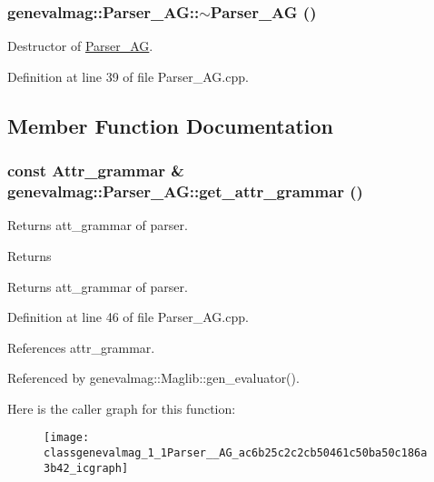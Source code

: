 \hypertarget{classgenevalmag_1_1Parser__AG_a834ddbb83e5822f485d16cdc432762cf}{
\subsubsection[{$\sim$Parser\_\-AG}]{\setlength{\rightskip}{0pt plus 5cm}genevalmag::Parser\_\-AG::$\sim$Parser\_\-AG ()}}
\label{classgenevalmag_1_1Parser__AG_a834ddbb83e5822f485d16cdc432762cf}
Destructor of \hyperlink{classgenevalmag_1_1Parser__AG}{Parser\_\-AG}. 

Definition at line 39 of file Parser\_\-AG.cpp.



\subsection{Member Function Documentation}
\hypertarget{classgenevalmag_1_1Parser__AG_ac6b25c2c2cb50461c50ba50c186a3b42}{
\subsubsection[{get\_\-attr\_\-grammar}]{\setlength{\rightskip}{0pt plus 5cm}const {\bf Attr\_\-grammar} \& genevalmag::Parser\_\-AG::get\_\-attr\_\-grammar ()}}
\label{classgenevalmag_1_1Parser__AG_ac6b25c2c2cb50461c50ba50c186a3b42}
Returns att\_\-grammar of parser. \begin{DoxyReturn}{Returns}

\end{DoxyReturn}
Returns att\_\-grammar of parser. 

Definition at line 46 of file Parser\_\-AG.cpp.



References attr\_\-grammar.



Referenced by genevalmag::Maglib::gen\_\-evaluator().



Here is the caller graph for this function:\nopagebreak
\begin{figure}[H]
\begin{center}
\leavevmode
\texttt{[image: classgenevalmag\_1\_1Parser\_\_AG\_ac6b25c2c2cb50461c50ba50c186a3b42\_icgraph]}
\end{center}
\end{figure}


